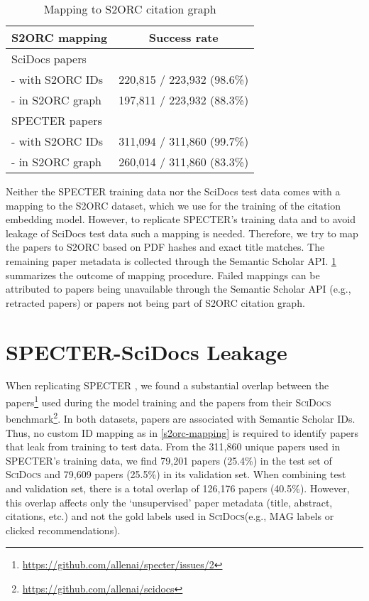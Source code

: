 \documentclass[11pt]{article}
\newcommand{\dataset}{\textsc{SciDocs}\xspace}
\begin{document}
\begin{table}[ht]
\centering
\footnotesize
\caption{Mapping to S2ORC citation graph}
\label{tab:id-mapping}
\begin{tabular}{lr}
\toprule
\multicolumn{1}{c}{\textbf{S2ORC mapping}} & \multicolumn{1}{c}{\textbf{Success rate}} \\
\midrule
SciDocs papers          & \multicolumn{1}{l}{}       \\
- with S2ORC IDs        & 220,815 / 223,932 (98.6\%) \\
- in S2ORC graph & 197,811 / 223,932 (88.3\%) \\
\rule{0pt}{4ex}    
SPECTER papers          & \multicolumn{1}{l}{}       \\
- with S2ORC IDs        & 311,094 / 311,860 (99.7\%) \\
- in S2ORC graph    & 260,014 / 311,860 (83.3\%) \\ 
\bottomrule
\end{tabular}
\end{table}

Neither the SPECTER training data nor the SciDocs test data comes with a mapping to the S2ORC dataset, which we use for the training of the citation embedding model.
However, to replicate SPECTER's training data and to avoid leakage of SciDocs test data such a mapping is needed.
Therefore, we try to map the papers to S2ORC based on PDF hashes and exact title matches. The remaining paper metadata is collected through the Semantic Scholar API.
\cref{tab:id-mapping} summarizes the outcome of mapping procedure.
Failed mappings can be attributed to papers being unavailable through the Semantic Scholar API (e.g., retracted  papers) or papers not being part of S2ORC citation graph.

\section{SPECTER-SciDocs Leakage} \label{ssec:leakage}


When replicating SPECTER \cite{Cohan2020}, we found a substantial overlap between the papers\footnote{\url{https://github.com/allenai/specter/issues/2}} used during the model training and the papers from their \dataset benchmark\footnote{\url{https://github.com/allenai/scidocs}}.
In both datasets, papers are associated with Semantic Scholar IDs. Thus, no custom ID mapping as in \cref{s2orc-mapping} is required to identify papers that leak from training to test data. 
From the 311,860 unique papers used in SPECTER's training data, we find 79,201 papers (25.4\%) in the test set of \dataset and 79,609 papers (25.5\%) in its validation set.
When combining test and validation set, there is a total overlap of 126,176 papers (40.5\%).
However, this overlap affects only the `unsupervised' paper metadata (title, abstract, citations, etc.) and not the gold labels used in \dataset (e.g., MAG labels or clicked recommendations).
\end{document}

